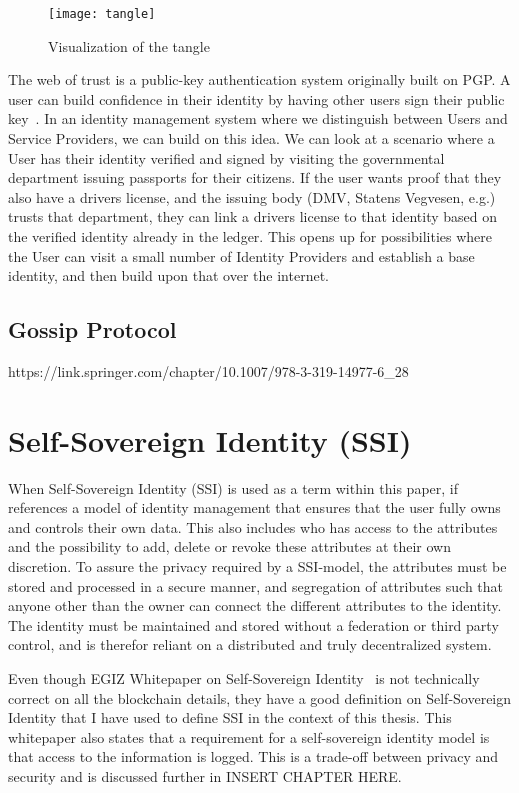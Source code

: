 \begin{figure}[ht]
    \centering
    \texttt{[image: tangle]}
    \caption{Visualization of the tangle \cite{IOTA_Whitepaper}}
    \label{fig:tangle}
\end{figure}
The web of trust is a public-key authentication system originally built on PGP. A user can build confidence in their identity by having other users sign their public key~\cite{Azouvi2017}. In an identity management system where we distinguish between Users and Service Providers, we can build on this idea. We can look at a scenario where a User has their identity verified and signed by visiting the governmental department issuing passports for their citizens. If the user wants proof that they also have a drivers license, and the issuing body (DMV, Statens Vegvesen, e.g.) trusts that department, they can link a drivers license to that identity based on the verified identity already in the ledger. This opens up for possibilities where the User can visit a small number of Identity Providers and establish a base identity, and then build upon that over the internet.

\subsection{Gossip Protocol}
https://link.springer.com/chapter/10.1007/978-3-319-14977-6\_28

\section{Self-Sovereign Identity (SSI)}
When Self-Sovereign Identity (SSI) is used as a term within this paper, if references a model of identity management that ensures that the user fully owns and controls their own data. This also includes who has access to the attributes and the possibility to add, delete or revoke these attributes at their own discretion. To assure the privacy required by a SSI-model, the attributes must be stored and processed in a secure manner, and segregation of attributes such that anyone other than the owner can connect the different attributes to the identity. The identity must be maintained and stored without a federation or third party control, and is therefor reliant on a distributed and truly decentralized system.

Even though EGIZ Whitepaper on Self-Sovereign Identity~\cite{ssi} is not technically correct on all the blockchain details, they have a good definition on Self-Sovereign Identity that I have used to define SSI in the context of this thesis. This whitepaper also states that a requirement for a self-sovereign identity model is that access to the information is logged. This is a trade-off between privacy and security and is discussed further in INSERT CHAPTER HERE. 

